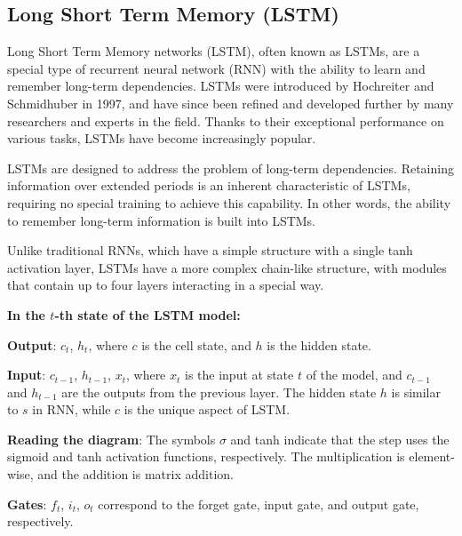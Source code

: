 \documentclass{ieeeojies}
\begin{document}
  \subsection{Long Short Term Memory (LSTM)}

   Long Short Term Memory networks (LSTM), often known as LSTMs, are a special type of recurrent neural network (RNN) with the ability to learn and remember long-term dependencies. LSTMs were introduced by Hochreiter and Schmidhuber in 1997, and have since been refined and developed further by many researchers and experts in the field. Thanks to their exceptional performance on various tasks, LSTMs have become increasingly popular.

  LSTMs are designed to address the problem of long-term dependencies. Retaining information over extended periods is an inherent characteristic of LSTMs, requiring no special training to achieve this capability. In other words, the ability to remember long-term information is built into LSTMs.

  Unlike traditional RNNs, which have a simple structure with a single tanh activation layer, LSTMs have a more complex chain-like structure, with modules that contain up to four layers interacting in a special way.

  \noindent 
  \textbf{In the \(t\)-th state of the LSTM model:}

\textbf{Output}: \(c_t\), \(h_t\), where \(c\) is the cell state, and \(h\) is the hidden state.

\textbf{Input}: \(c_{t-1}\), \(h_{t-1}\), \(x_t\), where \(x_t\) is the input at state \(t\) of the model, and \(c_{t-1}\) and \(h_{t-1}\) are the outputs from the previous layer. The hidden state \(h\) is similar to \(s\) in RNN, while \(c\) is the unique aspect of LSTM.

\textbf{Reading the diagram}: The symbols \(\sigma\) and tanh indicate that the step uses the sigmoid and tanh activation functions, respectively. The multiplication is element-wise, and the addition is matrix addition.

\textbf{Gates}: \(f_t\), \(i_t\), \(o_t\) correspond to the forget gate, input gate, and output gate, respectively.
\end{document}
